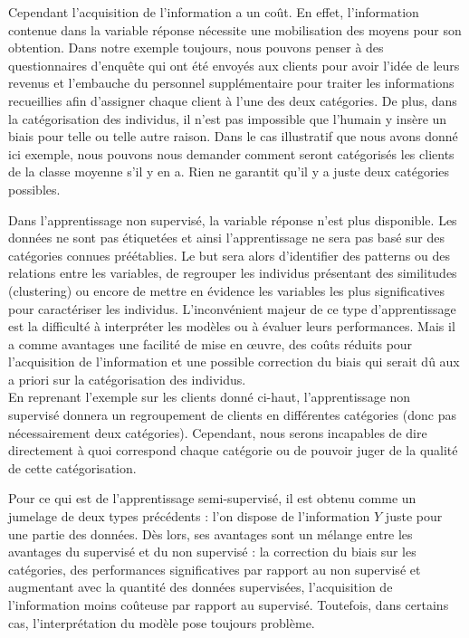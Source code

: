\documentclass[12pt,a4paper]{book}
\newcommand{\1}{\mathds{1}}
\begin{document}
Cependant l'acquisition de l'information a un coût. En effet, l'information contenue dans la variable réponse nécessite une mobilisation des moyens pour son obtention. Dans notre exemple toujours, nous pouvons penser à des questionnaires d'enquête qui ont été envoyés aux clients pour avoir l'idée de leurs revenus  et l'embauche du personnel supplémentaire pour traiter les informations recueillies afin d'assigner chaque client à l'une des deux catégories. De plus, dans la catégorisation des individus, il n'est pas impossible que l'humain y insère un biais pour telle ou telle autre raison. Dans le cas illustratif que nous avons donné ici exemple, nous pouvons nous demander comment seront catégorisés les clients de la classe moyenne s'il y en a. Rien ne garantit qu'il y a juste deux catégories possibles.

Dans l'apprentissage non supervisé, la variable réponse n'est plus disponible. Les données ne sont pas étiquetées et ainsi l'apprentissage ne sera pas basé sur des catégories connues préétablies. Le but sera alors d'identifier des patterns ou des relations entre les variables, de regrouper les individus présentant des similitudes (clustering) ou encore de mettre en évidence les variables les plus significatives pour caractériser les individus. L'inconvénient majeur de ce type d'apprentissage est la difficulté à interpréter les modèles ou à évaluer leurs performances. Mais il a comme avantages une facilité de mise en œuvre, des coûts réduits pour l'acquisition de l'information et une possible correction du biais qui serait dû aux a priori sur la catégorisation des individus.\\
En reprenant l'exemple sur les clients donné ci-haut, l'apprentissage non supervisé donnera un regroupement de clients en différentes catégories (donc pas nécessairement deux catégories). Cependant, nous serons incapables de dire directement à quoi correspond chaque catégorie ou de pouvoir juger de la qualité de cette catégorisation.

Pour ce qui est de l'apprentissage semi-supervisé, il est obtenu comme un jumelage de deux types précédents : l'on dispose de l'information $Y$ juste pour une partie des données. Dès lors, ses avantages sont un mélange entre les avantages du supervisé et du non supervisé : la correction du biais sur les catégories, des performances significatives par rapport au non supervisé et augmentant avec la quantité des données supervisées, l'acquisition de l'information moins coûteuse par rapport au supervisé. Toutefois, dans certains cas, l'interprétation du modèle pose toujours problème.
\end{document}
